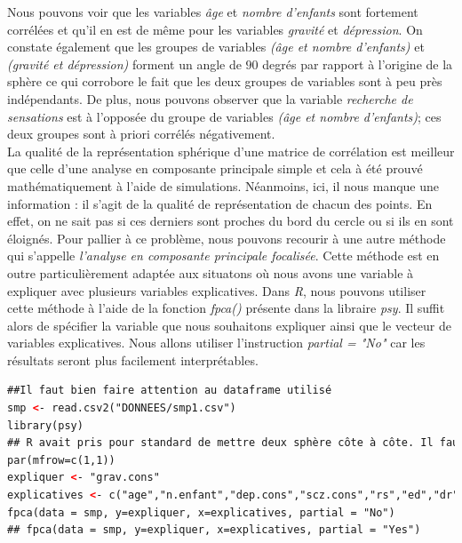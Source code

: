 Nous pouvons voir que les variables \textit{âge} et \textit{nombre d'enfants} sont fortement corrélées et qu'il en est de même pour les variables \textit{gravité} et \textit{dépression}. On constate également que les groupes de variables \textit{(âge et nombre d'enfants)} et \textit{(gravité et dépression)} forment un angle de $90$ degrés par rapport à l'origine de la sphère ce qui corrobore le fait que les deux groupes de variables sont à peu près indépendants. De plus, nous pouvons observer que la variable \textit{recherche de sensations} est à l'opposée du groupe de variables  \textit{(âge et nombre d'enfants)}; ces deux groupes sont à priori corrélés négativement.\newline
\\
La qualité de la représentation sphérique d'une matrice de corrélation est meilleur que celle d'une analyse en composante principale simple et cela à été prouvé mathématiquement à l'aide de simulations. Néanmoins, ici, il nous manque une information : il s'agit de la qualité de représentation de chacun des points. En effet, on ne sait pas si ces derniers sont proches du bord du cercle ou si ils en sont éloignés. Pour pallier à ce problème, nous pouvons recourir à une autre méthode qui s'appelle \textit{l'analyse en composante principale  focalisée}. Cette méthode est en outre particulièrement adaptée aux situatons où nous avons une variable à expliquer avec plusieurs variables explicatives.\newline
Dans \textit{R}, nous pouvons utiliser cette méthode à l'aide de la fonction \textit{fpca()} présente dans la libraire \textit{psy}. Il suffit alors de spécifier la variable que nous souhaitons expliquer ainsi que le vecteur de variables explicatives.\newline
Nous allons utiliser l'instruction \textit{partial = "No"} car les résultats seront plus facilement interprétables.

\begin{lstlisting}[language=html]
##Il faut bien faire attention au dataframe utilisé
smp <- read.csv2("DONNEES/smp1.csv")
library(psy)
## R avait pris pour standard de mettre deux sphère côte à côte. Il faut donc reformater la fenêtre 
par(mfrow=c(1,1))
expliquer <- "grav.cons"
explicatives <- c("age","n.enfant","dep.cons","scz.cons","rs","ed","dr")
fpca(data = smp, y=expliquer, x=explicatives, partial = "No")
## fpca(data = smp, y=expliquer, x=explicatives, partial = "Yes")
\end{lstlisting}

